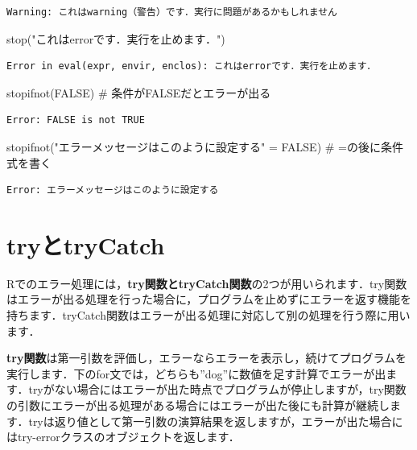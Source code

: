\documentclass[
  letterpaper,
  DIV=11,
  numbers=noendperiod]{scrreprt}
\newenvironment{Shaded}{\begin{snugshade}}{\end{snugshade}}
\newcommand{\CommentTok}[1]{\textcolor[rgb]{0.37,0.37,0.37}{#1}}
\newcommand{\ConstantTok}[1]{\textcolor[rgb]{0.56,0.35,0.01}{#1}}
\newcommand{\FunctionTok}[1]{\textcolor[rgb]{0.28,0.35,0.67}{#1}}
\newcommand{\NormalTok}[1]{\textcolor[rgb]{0.00,0.23,0.31}{#1}}
\newcommand{\OtherTok}[1]{\textcolor[rgb]{0.00,0.23,0.31}{#1}}
\newcommand{\StringTok}[1]{\textcolor[rgb]{0.13,0.47,0.30}{#1}}
\begin{document}
\begin{verbatim}
Warning: これはwarning（警告）です．実行に問題があるかもしれません
\end{verbatim}

\begin{Shaded}
\begin{Highlighting}[]
\FunctionTok{stop}\NormalTok{(}\StringTok{"これはerrorです．実行を止めます．"}\NormalTok{)}
\end{Highlighting}
\end{Shaded}

\begin{verbatim}
Error in eval(expr, envir, enclos): これはerrorです．実行を止めます．
\end{verbatim}

\begin{Shaded}
\begin{Highlighting}[]
\FunctionTok{stopifnot}\NormalTok{(}\ConstantTok{FALSE}\NormalTok{) }\CommentTok{\# 条件がFALSEだとエラーが出る}
\end{Highlighting}
\end{Shaded}

\begin{verbatim}
Error: FALSE is not TRUE
\end{verbatim}

\begin{Shaded}
\begin{Highlighting}[]
\FunctionTok{stopifnot}\NormalTok{(}\StringTok{"エラーメッセージはこのように設定する"} \OtherTok{=} \ConstantTok{FALSE}\NormalTok{) }\CommentTok{\# =の後に条件式を書く}
\end{Highlighting}
\end{Shaded}

\begin{verbatim}
Error: エラーメッセージはこのように設定する
\end{verbatim}

\hypertarget{tryux3068trycatch}{%
\section{tryとtryCatch}\label{tryux3068trycatch}}

Rでのエラー処理には，\textbf{try関数とtryCatch関数}の2つが用いられます．try関数はエラーが出る処理を行った場合に，プログラムを止めずにエラーを返す機能を持ちます．tryCatch関数はエラーが出る処理に対応して別の処理を行う際に用います．

\textbf{try関数}は第一引数を評価し，エラーならエラーを表示し，続けてプログラムを実行します．下のfor文では，どちらも''dog''に数値を足す計算でエラーが出ます．tryがない場合にはエラーが出た時点でプログラムが停止しますが，try関数の引数にエラーが出る処理がある場合にはエラーが出た後にも計算が継続します．tryは返り値として第一引数の演算結果を返しますが，エラーが出た場合にはtry-errorクラスのオブジェクトを返します．
\end{document}

